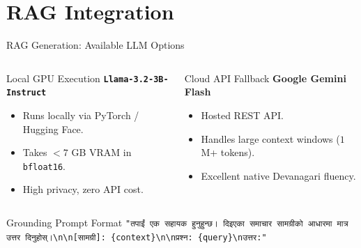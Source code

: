 \documentclass[aspectratio=169]{beamer}
\begin{document}
\section{RAG Integration}
\begin{frame}{RAG Generation: Available LLM Options}
  \begin{columns}
    \begin{block}{Local GPU Execution}
      \textbf{\texttt{Llama-3.2-3B-Instruct}}
      \begin{itemize}
        \item Runs locally via PyTorch / Hugging Face.
        \item Takes $<7$ GB VRAM in \texttt{bfloat16}.
        \item High privacy, zero API cost.
      \end{itemize}
    \end{block}

    \begin{block}{Cloud API Fallback}
      \textbf{Google Gemini Flash}
      \begin{itemize}
        \item Hosted REST API.
        \item Handles large context windows ($1$M+ tokens).
        \item Excellent native Devanagari fluency.
      \end{itemize}
    \end{block}
  \end{columns}
  \vspace{0.3cm}
  \begin{exampleblock}{Grounding Prompt Format}
    \texttt{"तपाईं एक सहायक हुनुहुन्छ। दिइएका समाचार सामग्रीको आधारमा मात्र उत्तर दिनुहोस्।\textbackslash n\textbackslash n[सामग्री]: \{context\}\textbackslash n\textbackslash nप्रश्न: \{query\}\textbackslash nउत्तर:"}
  \end{exampleblock}
\end{frame}

\end{document}
